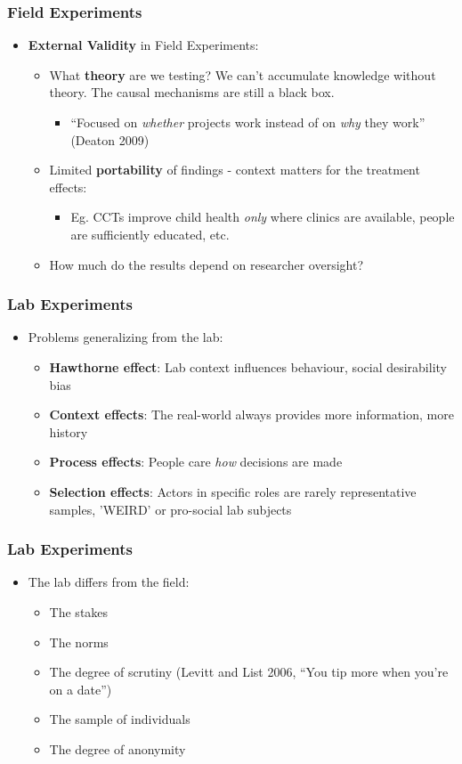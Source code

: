 \documentclass[xcolor=x11names,compress]{beamer}\usepackage[]{graphicx}\usepackage[]{xcolor}
\renewcommand{\(}{\begin{columns}}
\renewcommand{\)}{\end{columns}}
\newcommand{\<}[1]{\begin{column}{#1}}
\renewcommand{\>}{\end{column}}
\begin{document}
\begin{frame}
\frametitle{Field Experiments}
\begin{itemize}
\item \textbf{External Validity} in Field Experiments:
\pause
\begin{itemize}
\item What \textbf{theory} are we testing? We can't accumulate knowledge without theory. The causal mechanisms are still a black box.
\pause
\begin{itemize}
\item ``Focused on \textit{whether} projects work instead of on \textit{why} they work'' (Deaton 2009)
\end{itemize}
\pause
\item Limited \textbf{portability} of findings - context matters for the treatment effects:
\pause
\begin{itemize}
\item Eg. CCTs improve child health \textit{only} where clinics are available, people are sufficiently educated, etc.
\end{itemize}
\pause
\item How much do the results depend on researcher oversight?
\end{itemize}
\end{itemize}
\end{frame}

\begin{frame}
\frametitle{Lab Experiments}
\begin{itemize}
\item Problems generalizing from the lab:
\pause
\begin{itemize}
\item \textbf{Hawthorne effect}: Lab context influences behaviour, social desirability bias
\pause
\item \textbf{Context effects}: The real-world always provides more information, more history
\pause
\item \textbf{Process effects}: People care \textit{how} decisions are made
\pause
\item \textbf{Selection effects}: Actors in specific roles are rarely representative samples, 'WEIRD' or pro-social lab subjects
\end{itemize}
\end{itemize}
\end{frame}

\begin{frame}
\frametitle{Lab Experiments}
\begin{itemize}
\item The lab differs from the field:
\pause
\begin{itemize}
\item The stakes
\item The norms
\item The degree of scrutiny (Levitt and List 2006, ``You tip more when you're on a date'')
\item The sample of individuals
\item The degree of anonymity
\end{itemize}
\end{itemize}
\end{frame}
\end{document}
